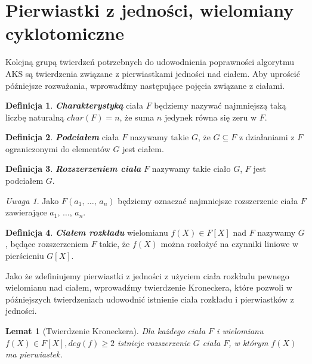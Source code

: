 \documentclass[polish,declaration,shortabstract]{iithesis}
\theoremstyle{definition}
\newtheorem{definition}{Definicja}
\theoremstyle{remark} \newtheorem{observation}{Obserwacja}
\theoremstyle{plain} \newtheorem{theorem}{Twierdzenie}
\theoremstyle{plain} \newtheorem{lemma}{Lemat}
\theoremstyle{remark} \newtheorem*{remark*}{Uwaga}
\theoremstyle{reminder} \newtheorem*{reminder*}{Przypomnienie}
\begin{document}
\section{Pierwiastki z jedności, wielomiany cyklotomiczne}

Kolejną grupą twierdzeń potrzebnych do udowodnienia poprawności algorytmu AKS są twierdzenia związane z pierwiastkami jedności nad ciałem. Aby uprościć późniejsze rozważania, wprowadźmy następujące pojęcia związane z ciałami.

\begin{definition}
	\textbf{\textit{Charakterystyką}} ciała $F$ będziemy nazywać najmniejszą taką liczbę naturalną $char(F) = n$, że suma $n$ jedynek równa się zeru w $F$.
\end{definition}

\begin{definition}
	\textit{\textbf{Podciałem}} ciała $F$ nazywamy takie $G$, że $G \subseteq F$ z działaniami z $F$ ograniczonymi do elementów $G$ jest ciałem.
\end{definition}
	
\begin{definition}
	\textit{\textbf{Rozszerzeniem ciała}} $F$ nazywamy takie ciało $G$, $F$ jest podciałem $G$.
\end{definition}
	
\begin{remark*}
	Jako $F(a_1, \, \dots,\, a_n)$ będziemy oznaczać najmniejsze rozszerzenie ciała $F$ zawierające $a_1, \, \dots,\, a_n$.
\end{remark*}
	
\begin{definition}
	\textit{\textbf{Ciałem rozkładu}} wielomianu $f(X) \in F[X]$ nad $F$ nazywamy $G$, będące rozszerzeniem $F$ takie, że $f(X)$ można rozłożyć na czynniki liniowe w pierścieniu $G[X]$.
\end{definition}

Jako że zdefiniujemy pierwiastki z jedności z użyciem ciała rozkładu pewnego wielomianu nad ciałem, wprowadźmy twierdzenie Kroneckera, które pozwoli w późniejszych twierdzeniach udowodnić istnienie ciała rozkładu i pierwiastków z jedności.
	
\begin{lemma}[Twierdzenie Kroneckera] \label{Kronecker}
	Dla każdego ciała $F$ i wielomianu $f(X) \in F[X], deg(f) \geq 2$ istnieje rozszerzenie $G$ ciała $F$, w którym $f(X)$ ma pierwiastek.
\end{lemma}
	
\end{document}

